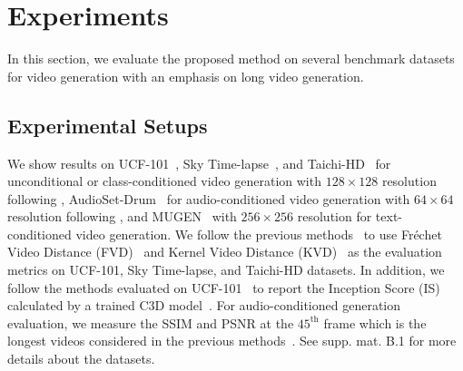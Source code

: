 \section{Experiments}
In this section, we evaluate the proposed method on several benchmark datasets for video generation with an emphasis on long video generation.
\subsection{Experimental Setups}
 We show results on UCF-101~\cite{soomro2012ucf101}, Sky Time-lapse~\cite{xiong2018learning}, and Taichi-HD~\cite{siarohin2019first} for unconditional or class-conditioned video generation with $128\times 128$ resolution following \cite{yu2021generating}, AudioSet-Drum~\cite{gemmeke2017audio} for audio-conditioned video generation with $64\times 64$ resolution following \cite{le2021ccvs}, and MUGEN~\cite{mugen2022mugen} with $256\times256$ resolution 
for text-conditioned video generation. We follow the previous methods~\cite{tian2021a,yu2021generating} to use Fréchet Video Distance (FVD)~\cite{unterthiner2018towards} and Kernel Video Distance (KVD)~\cite{unterthiner2018towards} as the evaluation metrics on UCF-101, Sky Time-lapse, and Taichi-HD datasets. In addition, we follow the methods evaluated on UCF-101~\cite{clark2019adversarial,le2021ccvs} to report the Inception Score (IS)~\cite{saito2020train} calculated by a trained C3D model~\cite{tran2015learning}. For audio-conditioned generation evaluation, we measure the SSIM and PSNR at the $45^\text{th}$ frame which is the longest videos considered in the previous methods~\cite{chatterjee2020sound2sight,le2021ccvs}. See 
supp. mat. B.1 for more details about the datasets.

